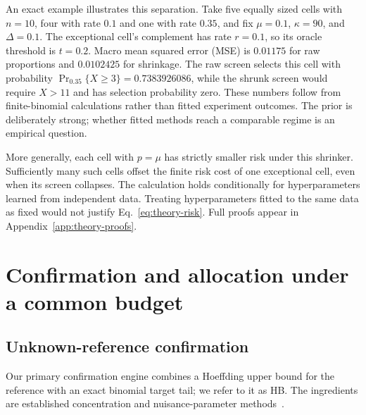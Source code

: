 An exact example illustrates this separation. Take five equally sized
cells with $n=10$, four with rate $0.1$ and one with rate $0.35$, and fix
$\mu=0.1$, $\kappa=90$, and $\Delta=0.1$. The exceptional cell's complement
has rate $r=0.1$, so its oracle threshold is $t=0.2$. Macro mean squared error (MSE) is
$0.01175$ for raw proportions and $0.0102425$ for shrinkage. The raw
screen selects this cell with probability
$\Pr_{0.35}\{X\ge3\}=0.7383926086$, while the shrunk screen would require
$X>11$ and has selection probability zero. These numbers follow from
finite-binomial calculations rather than fitted experiment outcomes. The
prior is deliberately strong; whether fitted methods reach a comparable
regime is an empirical question.

More generally, each cell with $p=\mu$ has strictly smaller risk under
this shrinker. Sufficiently many such cells offset the finite risk cost of
one exceptional cell, even when its screen collapses. The calculation
holds conditionally for hyperparameters learned from independent data.
Treating hyperparameters fitted to the same data as fixed would not justify
Eq.~\eqref{eq:theory-risk}. Full proofs appear in
Appendix~\ref{app:theory-proofs}.

\section{Confirmation and allocation under a common budget}
\label{sec:confirmation}

\subsection{Unknown-reference confirmation}

Our primary confirmation engine combines a Hoeffding upper bound for the
reference with an exact binomial target tail; we refer to it as HB. The
ingredients are established concentration and nuisance-parameter
methods~\citep{hoeffding1963probability,berger1994pvalues}.

